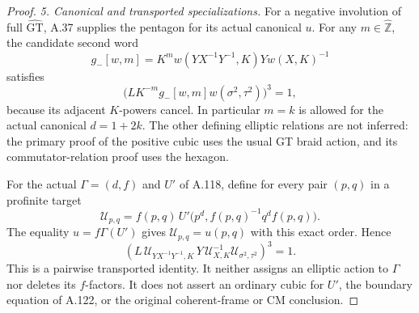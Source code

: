 \begin{proof}
\emph{5. Canonical and transported specializations.}
For a negative involution of full \(\widehat{\mathrm{GT}}\), A.37
supplies the pentagon for its actual canonical \(u\). For any
\(m\in\widehat{\mathbb Z}\), the candidate second word
\[
 g_-[w,m]=K^m w(YX^{-1}Y^{-1},K)Yw(X,K)^{-1}
\]
satisfies
\[
 \bigl(LK^{-m}g_-[w,m]w(\sigma^2,\tau^2)\bigr)^3=1,            \tag{A.121.11}
\]
because its adjacent \(K\)-powers cancel. In particular \(m=k\)
is allowed for the actual canonical \(d=1+2k\).
The other defining elliptic relations are not inferred: the primary
proof of the positive cubic uses the usual GT braid action, and its
commutator-relation proof uses the hexagon.

For the actual \(\Gamma=(d,f)\) and \(U'\) of A.118, define for
every pair \((p,q)\) in a profinite target
\[
 \mathcal U_{p,q}
 =f(p,q)\,
 U'\bigl(p^d,f(p,q)^{-1}q^df(p,q)\bigr).                        \tag{A.121.12}
\]
The equality \(u=f\Gamma(U')\) gives
\(\mathcal U_{p,q}=u(p,q)\) with this exact order. Hence
\[
 \left(
 L\,\mathcal U_{YX^{-1}Y^{-1},K}\,Y\,
       \mathcal U_{X,K}^{-1}\mathcal U_{\sigma^2,\tau^2}
 \right)^3=1.                                                 \tag{A.121.13}
\]
This is a pairwise transported identity. It neither assigns an
elliptic action to \(\Gamma\) nor deletes its \(f\)-factors.
It does not assert an ordinary cubic for \(U'\), the boundary equation
of A.122, or the original coherent-frame or CM conclusion.
\end{proof}
